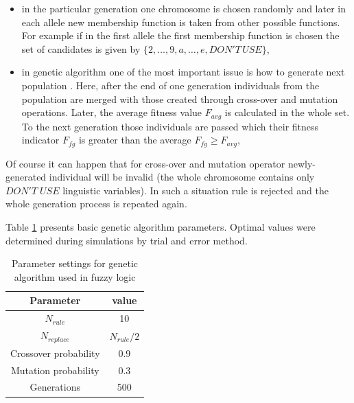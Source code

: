 \begin{itemize}
\begin{itemize}
\begin{figure}[H]
                    \label{fig:cross_over}
                \end{figure}
            \item in the particular generation one chromosome is chosen
                randomly and later in each allele new membership function is
                taken from other possible functions. For example if in the first
                allele the first membership function is chosen the set of
                candidates is given by $\{2, \ldots, 9, a, \ldots, e, DON'T\,
                USE\}$,
            \item in genetic algorithm one of the most important issue is how
                to generate next population \cite{bib22}. Here, after the end of one
                generation individuals from the population are merged with
                those created through cross-over and mutation operations.
                Later, the average fitness value $F_{avg}$ is calculated in the whole
                set. To the next generation those individuals are passed which
                their fitness indicator $F_{fg}$ is greater than the average
                $F_{fg} \ge F_{avg}$,
        \end{itemize}
\end{itemize}
Of course it can happen that for cross-over and mutation operator
newly-generated individual will be invalid (the whole chromosome contains only
$DON'T\; USE$ linguistic variables). In such a situation rule is rejected and
the whole generation process is repeated again.

Table \ref{tab:fuzzy_genetic_parameters} presents basic genetic algorithm parameters.
Optimal values were determined during simulations by trial and error method.
\begin{table}[H]
    \caption{Parameter settings for genetic algorithm used in fuzzy logic}
    \centering
    \begin{tabular}{|c|c|}
        \hline
        Parameter & value \\ \hline \hline
        $N_{rule}$ & 10 \\ \hline
        $N_{replace}$ & $N_{rule}/2$ \\ \hline
        Crossover probability & 0.9 \\ \hline
        Mutation probability & 0.3 \\ \hline
        Generations & 500 \\ \hline
    \end{tabular}
    \label{tab:fuzzy_genetic_parameters}
\end{table}
